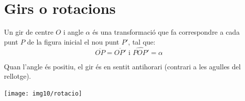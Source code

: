 \pagebreak

\section{Girs o rotacions}

\begin{theorybox}[Girs]
	 
	\begin{minipage}{0.5\textwidth}
		Un gir de centre $O$ i angle $\alpha$ és una transformació que fa correspondre a cada punt $P$ de la figura inicial el nou punt $P'$, tal que:
		\[  \overline{OP}=\overline{OP'}  \text{  i  }  \widehat{POP'}=\alpha \]
		
		Quan l'angle és positiu, el gir és en sentit antihorari (contrari a les agulles del rellotge).
	\end{minipage}
	\begin{minipage}{0.5\textwidth}
		\centering
		\texttt{[image: img10/rotacio]}
		
	\end{minipage}
	
	
\end{theorybox}

